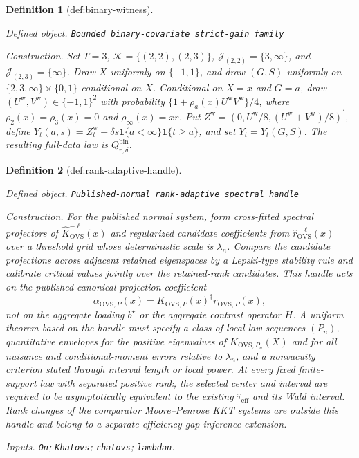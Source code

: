 \documentclass{article}
\newtheorem{definition}{Definition}
\begin{document}
\begin{definition}[def:binary-witness]\label{def:binary-witness}
\par\smallskip\noindent\emph{Defined object.} \texttt{Bounded binary-\allowbreak{}covariate strict-\allowbreak{}gain family}
\par\smallskip\noindent\emph{Construction.} Set \(T=3\), \(\mathcal K=\{(2,2),(2,3)\}\), \(\mathcal J_{(2,2)}=\{3,\infty\}\), and \(\mathcal J_{(2,3)}=\{\infty\}\). Draw \(X\) uniformly on \(\{-1,1\}\), and draw \((G,S)\) uniformly on \(\{2,3,\infty\}\times\{0,1\}\) conditional on \(X\). Conditional on \(X=x\) and \(G=a\), draw \((U^{\mathrm w},V^{\mathrm w})\in\{-1,1\}^2\) with probability \(\{1+\rho_a(x)U^{\mathrm w}V^{\mathrm w}\}/4\), where \(\rho_2(x)=\rho_3(x)=0\) and \(\rho_{\infty}(x)=xr\). Put \(Z^{\mathrm w}=(0,U^{\mathrm w}/8,(U^{\mathrm w}+V^{\mathrm w})/8)^{\prime}\), define \(Y_t(a,s)=Z_t^{\mathrm w}+\delta s\mathbf 1\{a<\infty\}\mathbf 1\{t\ge a\}\), and set \(Y_t=Y_t(G,S)\). The resulting full-data law is \(Q^{\mathrm{bin}}_{r,\delta}\).
\end{definition}

\begin{definition}[def:rank-adaptive-handle]\label{def:rank-adaptive-handle}
\par\smallskip\noindent\emph{Defined object.} \texttt{Published-\allowbreak{}normal rank-\allowbreak{}adaptive spectral handle}
\par\smallskip\noindent\emph{Construction.} For the published normal system, form cross-fitted spectral projectors of \(\widehat K_{\mathrm{OVS}}^{-\ell}(x)\) and regularized candidate coefficients from \(\widehat r_{\mathrm{OVS}}^{-\ell}(x)\) over a threshold grid whose deterministic scale is \(\lambda_n\).  Compare the candidate projections across adjacent retained eigenspaces by a Lepski-type stability rule and calibrate critical values jointly over the retained-rank candidates.  This handle acts on the published canonical-projection coefficient
\[
\alpha_{\mathrm{OVS},P}(x)=K_{\mathrm{OVS},P}(x)^\dagger r_{\mathrm{OVS},P}(x),
\]
not on the aggregate loading \(b^\star\) or the aggregate contrast operator \(H\).  A uniform theorem based on the handle must specify a class of local law sequences \((P_n)\), quantitative envelopes for the positive eigenvalues of \(K_{\mathrm{OVS},P_n}(X)\) and for all nuisance and conditional-moment errors relative to \(\lambda_n\), and a nonvacuity criterion stated through interval length or local power.  At every fixed finite-support law with separated positive rank, the selected center and interval are required to be asymptotically equivalent to the existing \(\widehat\tau_{\mathrm{eff}}\) and its Wald interval.  Rank changes of the comparator Moore--Penrose KKT systems are outside this handle and belong to a separate efficiency-gap inference extension.
\par\smallskip\noindent\emph{Inputs.} \texttt{On}; \texttt{Khatovs}; \texttt{rhatovs}; \texttt{lambdan}.
\end{definition}
\end{document}
